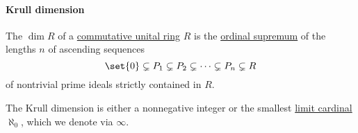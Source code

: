 \paragraph{Krull dimension}

\begin{definition}\label{def:krull_dimension}
  The  \( \dim R \) of a \hyperref[def:ring/commutative]{commutative unital ring} \( R \) is the \hyperref[thm:union_of_set_of_ordinals/supremum]{ordinal supremum} of the lengths \( n \) of ascending sequences
  \begin{equation*}
    \set{ 0 } \subsetneq P_1 \subsetneq P_2 \subsetneq \cdots \subsetneq P_n \subsetneq R
  \end{equation*}
  of nontrivial prime ideals strictly contained in \( R \).

  The Krull dimension is either a nonnegative integer or the smallest \hyperref[def:successor_and_limit_cardinal/weak_limit]{limit cardinal} \( \aleph_0 \), which we denote via \( \infty \).
\end{definition}

